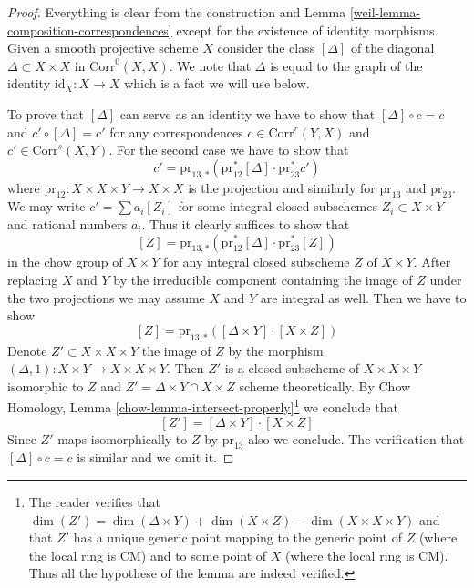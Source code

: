 \begin{proof}

Everything is clear from the construction and
Lemma \ref{weil-lemma-composition-correspondences}
except for the existence of identity morphisms.
Given a smooth projective scheme $X$ consider
the class $[\Delta]$ of the diagonal $\Delta \subset X \times X$
in $\text{Corr}^0(X, X)$. We note that $\Delta$ is
equal to the graph of the identity $\text{id}_X : X \to X$
which is a fact we will use below.

\medskip\noindent
To prove that $[\Delta]$ can serve as an identity we have to show that
$[\Delta] \circ c = c$ and $c' \circ [\Delta] = c'$ for any correspondences
$c \in \text{Corr}^r(Y, X)$ and $c' \in \text{Corr}^s(X, Y)$.
For the second case we have to show that
$$
c' = \text{pr}_{13, *}(\text{pr}_{12}^*[\Delta] \cdot \text{pr}_{23}^*c')
$$
where $\text{pr}_{12} : X \times X \times Y \to X \times X$ is the
projection and similarly for $\text{pr}_{13}$ and $\text{pr}_{23}$.
We may write $c' = \sum a_i [Z_i]$ for some integral closed subschemes
$Z_i \subset X \times Y$ and rational numbers $a_i$. Thus it clearly
suffices to show that
$$
[Z] = \text{pr}_{13, *}(\text{pr}_{12}^*[\Delta] \cdot \text{pr}_{23}^*[Z])
$$
in the chow group of $X \times Y$ for any integral closed subscheme $Z$
of $X \times Y$. After replacing $X$ and $Y$ by the
irreducible component containing the image of $Z$ under the two projections
we may assume $X$ and $Y$ are integral as well. Then we have to show
$$
[Z] = \text{pr}_{13, *}([\Delta \times Y] \cdot [X \times Z])
$$
Denote $Z' \subset X \times X \times Y$ the image of $Z$ by the morphism
$(\Delta, 1) : X \times Y \to X \times X \times Y$. Then $Z'$
is a closed subscheme of $X \times X \times Y$ isomorphic to $Z$ and
$Z' = \Delta \times Y \cap X \times Z$ scheme theoretically.
By Chow Homology, Lemma \ref{chow-lemma-intersect-properly}\footnote{The
reader verifies that $\dim(Z') = \dim(\Delta \times Y) + \dim(X \times Z) -
\dim(X \times X \times Y)$ and that $Z'$ has a unique generic point
mapping to the generic point of $Z$ (where the local ring is CM)
and to some point of $X$ (where the local ring is CM). Thus all the
hypothese of the lemma are indeed verified.}
we conclude that
$$
[Z'] = [\Delta \times Y] \cdot [X \times Z]
$$
Since $Z'$ maps isomorphically to $Z$ by $\text{pr}_{13}$ also
we conclude. The verification that
$[\Delta] \circ c = c$ is similar and we omit it.
\end{proof}

